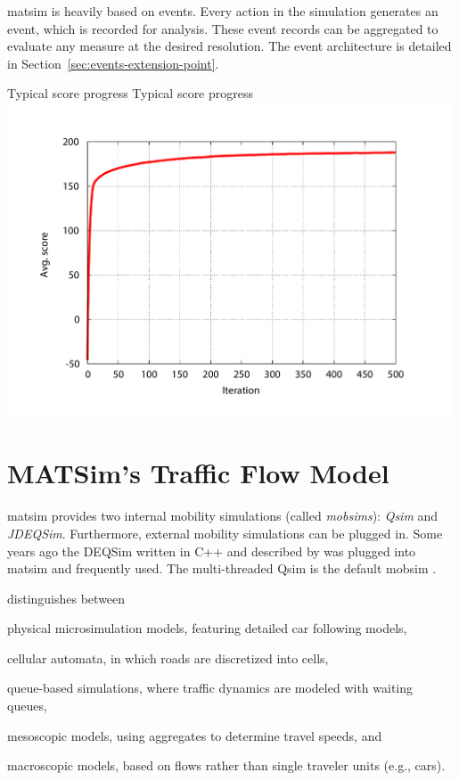\gls{matsim} is heavily based on events. Every action in the simulation generates an event, which is recorded for analysis. These event records can be aggregated to evaluate any measure at the desired resolution. The event architecture is detailed in Section~\ref{sec:events-extension-point}.

\createfigure%
{Typical score progress}%
{Typical score progress}%
{\label{fig:scoreprogress}}%
{\includegraphics[width=0.99\textwidth, angle=0]{using/figures/scores.pdf}}%
{}

\section{MATSim's Traffic Flow Model}
\label{sec:trafficflowmodel}
\gls{matsim} provides two internal mobility simulations (called \emph{mobsims}): \emph{Qsim} and \emph{JDEQSim}. Furthermore, external mobility simulations can be plugged in. Some years ago the DEQSim written in C++ and described by \citet[][]{Charypar_PhDThesis_2008, CharyparEtAl_TRR_2007, CharyparEtAl_TRB_2009, CharyparEtAl_WCTRS_2007} was plugged into \gls{matsim} and frequently used. The multi-threaded Qsim is the default mobsim \citep[][]{MATSim_Userguide_2015}. %

\citet[][]{CharyparEtAl_TRB_2009} distinguishes between 
\begin{compactitem}
\item physical microsimulation models, featuring detailed car following models,
\item cellular automata, in which roads are discretized into cells,
\item queue-based simulations, where traffic dynamics are modeled with waiting queues,
\item mesoscopic models, using aggregates to determine travel speeds, and
\item macroscopic models, based on flows rather than single traveler units (e.g., cars).
\end{compactitem}

